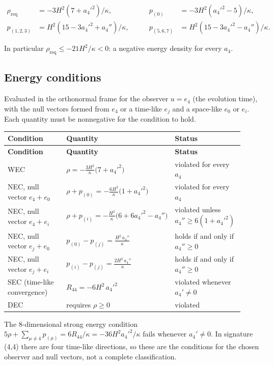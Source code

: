 \documentclass[11pt]{article}
\begin{document}
\[
\begin{aligned}
\rho_{\mathrm{req}}&=-3H^2(7+a_4'^2)/\kappa, &\qquad p_{(0)}&=-3H^2(a_4'^2-5)/\kappa, \\
p_{(1,2,3)}&=H^2(15-3a_4'^2+a_4'')/\kappa, &\qquad p_{(5,6,7)}&=H^2(15-3a_4'^2-a_4'')/\kappa .
\end{aligned}
\]

In particular $\rho_{\mathrm{req}}\le-21H^2/\kappa<0$: a negative energy density for every $a_4$.

\subsection{Energy conditions}

Evaluated in the orthonormal frame for the observer $u=e_4$ (the evolution time), with the null vectors formed from $e_4$ or a time-like $e_j$ and a space-like $e_0$ or $e_i$. Each quantity must be nonnegative for the condition to hold.

\begin{longtable}{@{}p{0.307\linewidth}p{0.307\linewidth}p{0.307\linewidth}@{}}
\toprule
\textbf{Condition} & \textbf{Quantity} & \textbf{Status} \\
\midrule
\endfirsthead
\toprule
\textbf{Condition} & \textbf{Quantity} & \textbf{Status} \\
\midrule
\endhead
WEC & $\rho=-\frac{3H^{2}}{\kappa}\bigl(7+a_4'^{2}\bigr)$ & violated for every $a_4$ \\
NEC, null vector $e_4+e_0$ & $\rho+p_{(0)}=-\frac{6H^{2}}{\kappa}\bigl(1+a_4'^{2}\bigr)$ & violated for every $a_4$ \\
NEC, null vector $e_4+e_i$ & $\rho+p_{(i)}=-\frac{H^{2}}{\kappa}\bigl(6+6a_4'^{2}-a_4''\bigr)$ & violated unless $a_4''\ge6(1+a_4'^2)$ \\
NEC, null vector $e_j+e_0$ & $p_{(0)}-p_{(j)}=\frac{H^{2}\,a_4''}{\kappa}$ & holds if and only if $a_4''\ge0$ \\
NEC, null vector $e_j+e_i$ & $p_{(i)}-p_{(j)}=\frac{2H^{2}\,a_4''}{\kappa}$ & holds if and only if $a_4''\ge0$ \\
SEC (time-like convergence) & $R_{44}=-6H^{2}\,a_4'^{2}$ & violated whenever $a_4'\ne0$ \\
DEC & requires $\rho\ge0$ & violated \\
\bottomrule
\end{longtable}

The 8-dimensional strong energy condition $5\rho+\sum_{\mu\ne4}p_{(\mu)}=6R_{44}/\kappa=-36H^2a_4'^2/\kappa$ fails whenever $a_4'\ne0$. In signature (4,4) there are four time-like directions, so these are the conditions for the chosen observer and null vectors, not a complete classification.
\end{document}

